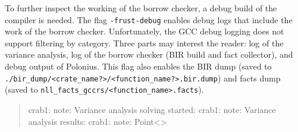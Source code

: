 \documentclass[
  11pt,
  twoside,symmetric]{report}
\newenvironment{Shaded}{}{}
\newcommand{\NormalTok}[1]{#1}
\begin{document}
To further inspect the working of the borrow checker, a debug build of
the compiler is needed. The flag \texttt{-frust-debug} enables debug
logs that include the work of the borrow checker. Unfortunately, the GCC
debug logging does not support filtering by category. Three parts may
interest the reader: log of the variance analysis, log of the borrow
checker (BIR build and fact collector), and debug output of Polonius.
This flag also enables the BIR dump (saved to
\texttt{./bir\_dump/\textless{}crate\_name?\textgreater{}/\textless{}function\_name?\textgreater{}.bir.dump})
and facts dump (saved to
\texttt{nll\_facts\_gccrs/\textless{}function\_name\textgreater{}.facts}).

\begin{quote}
\begin{Shaded}
\begin{Highlighting}[]
\NormalTok{crab1: note: Variance analysis solving started:}
\NormalTok{crab1: note: Variance analysis results:}
\NormalTok{crab1: note:  Point\textless{}\textgreater{}}
\end{Highlighting}
\end{Shaded}
\end{quote}
\end{document}
